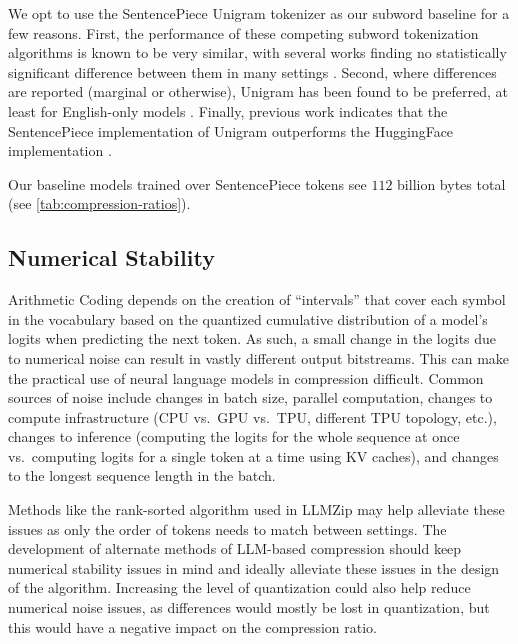 We opt to use the SentencePiece Unigram tokenizer as our subword baseline for a few reasons. First, the performance of these competing subword tokenization algorithms is known to be very similar, with several works finding no statistically significant difference between them in many settings \cite{kudo-2018-subword, ali-etal-2024-tokenizer, schmidt2024tokenizationcompression}. Second, where differences are reported (marginal or otherwise), Unigram has been found to be preferred, at least for English-only models \cite{kudo-2018-subword, bostrom-durrett-2020-byte, ali-etal-2024-tokenizer, schmidt2024tokenizationcompression}. Finally, previous work indicates that the SentencePiece implementation of Unigram outperforms the HuggingFace implementation \cite{ali-etal-2024-tokenizer, schmidt2024tokenizationcompression}.

Our baseline models trained over SentencePiece tokens see $112$ billion bytes total (see \ref{tab:compression-ratios}).

\subsection{Numerical Stability}
\label{sec:numerical-stability}

Arithmetic Coding depends on the creation of ``intervals'' that cover each symbol in the vocabulary based on the quantized cumulative distribution of a model's logits when predicting the next token. As such, a small change in the logits due to numerical noise can result in vastly different output bitstreams. This can make the practical use of neural language models in compression difficult. Common sources of noise include changes in batch size, parallel computation, changes to compute infrastructure (CPU vs.~GPU vs.~TPU, different TPU topology, etc.), changes to inference (computing the logits for the whole sequence at once vs.~computing logits for a single token at a time using KV caches), and changes to the longest sequence length in the batch.

Methods like the rank-sorted algorithm used in LLMZip \cite{valmeekamLLMZipLosslessText2023} may help alleviate these issues as only the order of tokens needs to match between settings. The development of alternate methods of LLM-based compression should keep numerical stability issues in mind and ideally alleviate these issues in the design of the algorithm. Increasing the level of quantization could also help reduce numerical noise issues, as differences would mostly be lost in quantization, but this would have a negative impact on the compression ratio.

